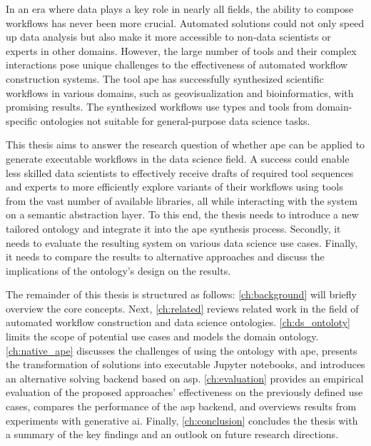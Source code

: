 In an era where data plays a key role in nearly all fields, the ability to compose workflows has never been more crucial. Automated solutions could not only speed up data analysis but also make it more accessible to non-data scientists or experts in other domains. However, the large number of tools and their complex interactions pose unique challenges to the effectiveness of automated workflow construction systems. The tool \ac{ape}\cite{kasalica2022synthesis} has successfully synthesized scientific workflows in various domains, such as geovisualization\cite{kasalica2019workflow} and bioinformatics\cite{kasalica2021ape}, with promising results. The synthesized workflows use types and tools from domain-specific ontologies not suitable for general-purpose data science tasks.

This thesis aims to answer the research question of whether \ac{ape} can be applied to generate executable workflows in the data science field. A success could enable less skilled data scientists to effectively receive drafts of required tool sequences and experts to more efficiently explore variants of their workflows using tools from the vast number of available libraries, all while interacting with the system on a semantic abstraction layer. To this end, the thesis needs to introduce a new tailored ontology and integrate it into the \ac{ape} synthesis process. Secondly, it needs to evaluate the resulting system on various data science use cases. Finally, it needs to compare the results to alternative approaches and discuss the implications of the ontology's design on the results.

The remainder of this thesis is structured as follows: \autoref{ch:background} will briefly overview the core concepts. Next, \autoref{ch:related} reviews related work in the field of automated workflow construction and data science ontologies. \autoref{ch:ds_ontoloty} limits the scope of potential use cases and models the domain ontology. \autoref{ch:native_ape} discusses the challenges of using the ontology with \ac{ape}, presents the transformation of solutions into executable Jupyter notebooks, and introduces an alternative solving backend based on \acf{asp}. \autoref{ch:evaluation} provides an empirical evaluation of the proposed approaches' effectiveness on the previously defined use cases, compares the performance of the \ac{asp} backend, and overviews results from experiments with generative \ac{ai}. Finally, \autoref{ch:conclusion} concludes the thesis with a summary of the key findings and an outlook on future research directions.
